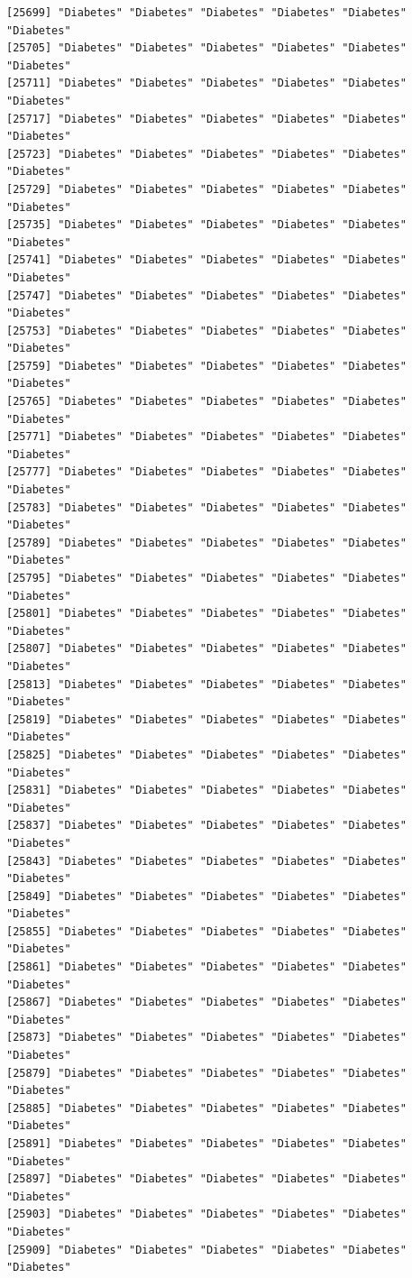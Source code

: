 \documentclass[
  letterpaper,
  DIV=11,
  numbers=noendperiod]{scrartcl}
\begin{document}
\begin{verbatim}
[25699] "Diabetes" "Diabetes" "Diabetes" "Diabetes" "Diabetes" "Diabetes"
[25705] "Diabetes" "Diabetes" "Diabetes" "Diabetes" "Diabetes" "Diabetes"
[25711] "Diabetes" "Diabetes" "Diabetes" "Diabetes" "Diabetes" "Diabetes"
[25717] "Diabetes" "Diabetes" "Diabetes" "Diabetes" "Diabetes" "Diabetes"
[25723] "Diabetes" "Diabetes" "Diabetes" "Diabetes" "Diabetes" "Diabetes"
[25729] "Diabetes" "Diabetes" "Diabetes" "Diabetes" "Diabetes" "Diabetes"
[25735] "Diabetes" "Diabetes" "Diabetes" "Diabetes" "Diabetes" "Diabetes"
[25741] "Diabetes" "Diabetes" "Diabetes" "Diabetes" "Diabetes" "Diabetes"
[25747] "Diabetes" "Diabetes" "Diabetes" "Diabetes" "Diabetes" "Diabetes"
[25753] "Diabetes" "Diabetes" "Diabetes" "Diabetes" "Diabetes" "Diabetes"
[25759] "Diabetes" "Diabetes" "Diabetes" "Diabetes" "Diabetes" "Diabetes"
[25765] "Diabetes" "Diabetes" "Diabetes" "Diabetes" "Diabetes" "Diabetes"
[25771] "Diabetes" "Diabetes" "Diabetes" "Diabetes" "Diabetes" "Diabetes"
[25777] "Diabetes" "Diabetes" "Diabetes" "Diabetes" "Diabetes" "Diabetes"
[25783] "Diabetes" "Diabetes" "Diabetes" "Diabetes" "Diabetes" "Diabetes"
[25789] "Diabetes" "Diabetes" "Diabetes" "Diabetes" "Diabetes" "Diabetes"
[25795] "Diabetes" "Diabetes" "Diabetes" "Diabetes" "Diabetes" "Diabetes"
[25801] "Diabetes" "Diabetes" "Diabetes" "Diabetes" "Diabetes" "Diabetes"
[25807] "Diabetes" "Diabetes" "Diabetes" "Diabetes" "Diabetes" "Diabetes"
[25813] "Diabetes" "Diabetes" "Diabetes" "Diabetes" "Diabetes" "Diabetes"
[25819] "Diabetes" "Diabetes" "Diabetes" "Diabetes" "Diabetes" "Diabetes"
[25825] "Diabetes" "Diabetes" "Diabetes" "Diabetes" "Diabetes" "Diabetes"
[25831] "Diabetes" "Diabetes" "Diabetes" "Diabetes" "Diabetes" "Diabetes"
[25837] "Diabetes" "Diabetes" "Diabetes" "Diabetes" "Diabetes" "Diabetes"
[25843] "Diabetes" "Diabetes" "Diabetes" "Diabetes" "Diabetes" "Diabetes"
[25849] "Diabetes" "Diabetes" "Diabetes" "Diabetes" "Diabetes" "Diabetes"
[25855] "Diabetes" "Diabetes" "Diabetes" "Diabetes" "Diabetes" "Diabetes"
[25861] "Diabetes" "Diabetes" "Diabetes" "Diabetes" "Diabetes" "Diabetes"
[25867] "Diabetes" "Diabetes" "Diabetes" "Diabetes" "Diabetes" "Diabetes"
[25873] "Diabetes" "Diabetes" "Diabetes" "Diabetes" "Diabetes" "Diabetes"
[25879] "Diabetes" "Diabetes" "Diabetes" "Diabetes" "Diabetes" "Diabetes"
[25885] "Diabetes" "Diabetes" "Diabetes" "Diabetes" "Diabetes" "Diabetes"
[25891] "Diabetes" "Diabetes" "Diabetes" "Diabetes" "Diabetes" "Diabetes"
[25897] "Diabetes" "Diabetes" "Diabetes" "Diabetes" "Diabetes" "Diabetes"
[25903] "Diabetes" "Diabetes" "Diabetes" "Diabetes" "Diabetes" "Diabetes"
[25909] "Diabetes" "Diabetes" "Diabetes" "Diabetes" "Diabetes" "Diabetes"

\end{verbatim}
\end{document}

